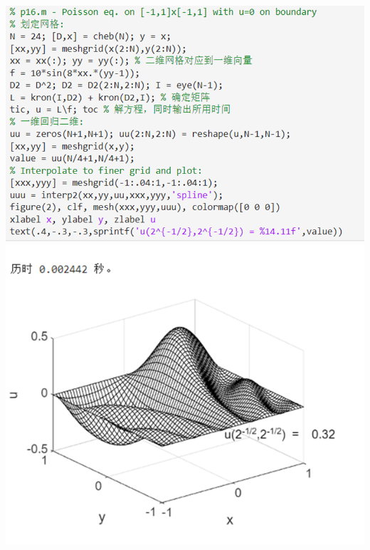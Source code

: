 \documentclass[12pt]{ctexart}
\numberwithin{equation}{section} %
\begin{document}
\includegraphics[width=1\textwidth]{程序图5.png}\\
\includegraphics[width=1\textwidth]{运行结果图4.png}\\
\end{document}
